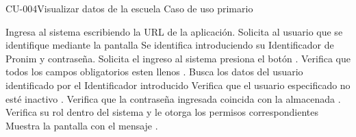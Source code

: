 \begin{UseCase}{CU-004}{Visualizar datos de la escuela}
{		%
		Caso de uso primario
	}
\end{UseCase}

\begin{UCtrayectoria}
	
	\UCpaso[\UCactor] Ingresa al sistema escribiendo la URL de la aplicación.
	\UCpaso Solicita al usuario que se identifique mediante la pantalla 
	\UCpaso[\UCactor] \label{UC1.Datos} Se identifica introduciendo su Identificador de Pronim y contraseña.
	\UCpaso[\UCactor] Solicita el ingreso al sistema presiona el botón .
    \UCpaso Verifica que todos los campos obligatorios esten llenos .
	\UCpaso Busca los datos del usuario identificado por el Identificador introducido 
	\UCpaso Verifica que el usuario especificado no esté inactivo .
	\UCpaso Verifica que la contraseña ingresada coincida con la almacenada .\label{UC1.Contrasenia}
	\UCpaso Verifica su rol dentro del sistema y le otorga los permisos correspondientes
	\UCpaso Muestra la pantalla  con el mensaje .
\end{UCtrayectoria}


